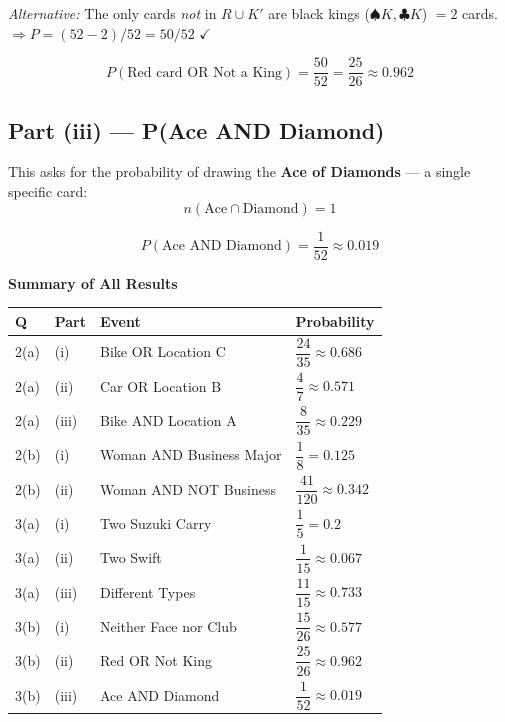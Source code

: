 \documentclass[12pt]{article}
\begin{document}
\textit{Alternative:} The only cards \emph{not} in $R \cup K'$ are black kings ($\spadesuit K, \clubsuit K$) $= 2$ cards.
$\Rightarrow P = (52-2)/52 = 50/52$ \quad $\checkmark$

\begin{answerbox}
\[
  P(\text{Red card OR Not a King}) = \frac{50}{52} = \frac{25}{26} \approx \mathbf{0.962}
\]
\end{answerbox}

\subsection*{Part (iii) --- P(Ace AND Diamond)}

This asks for the probability of drawing the \textbf{Ace of Diamonds} --- a single specific card:
\[
  n(\text{Ace} \cap \text{Diamond}) = 1
\]

\begin{answerbox}
\[
  P(\text{Ace AND Diamond}) = \frac{1}{52} \approx \mathbf{0.019}
\]
\end{answerbox}

\vspace{20pt}

\begin{formulabox}
\textbf{Summary of All Results}\\[8pt]
\begin{tabular}{p{1.3cm} p{1.3cm} p{8.5cm} p{2.5cm}}
\hline
\textbf{Q} & \textbf{Part} & \textbf{Event} & \textbf{Probability} \\
\hline
2(a) & (i) & Bike OR Location C & $\dfrac{24}{35} \approx 0.686$ \\[6pt]
2(a) & (ii) & Car OR Location B & $\dfrac{4}{7} \approx 0.571$ \\[6pt]
2(a) & (iii) & Bike AND Location A & $\dfrac{8}{35} \approx 0.229$ \\[6pt]
2(b) & (i) & Woman AND Business Major & $\dfrac{1}{8} = 0.125$ \\[6pt]
2(b) & (ii) & Woman AND NOT Business & $\dfrac{41}{120} \approx 0.342$ \\[6pt]
3(a) & (i) & Two Suzuki Carry & $\dfrac{1}{5} = 0.2$ \\[6pt]
3(a) & (ii) & Two Swift & $\dfrac{1}{15} \approx 0.067$ \\[6pt]
3(a) & (iii) & Different Types & $\dfrac{11}{15} \approx 0.733$ \\[6pt]
3(b) & (i) & Neither Face nor Club & $\dfrac{15}{26} \approx 0.577$ \\[6pt]
3(b) & (ii) & Red OR Not King & $\dfrac{25}{26} \approx 0.962$ \\[6pt]
3(b) & (iii) & Ace AND Diamond & $\dfrac{1}{52} \approx 0.019$ \\
\hline
\end{tabular}
\end{formulabox}
\end{document}
